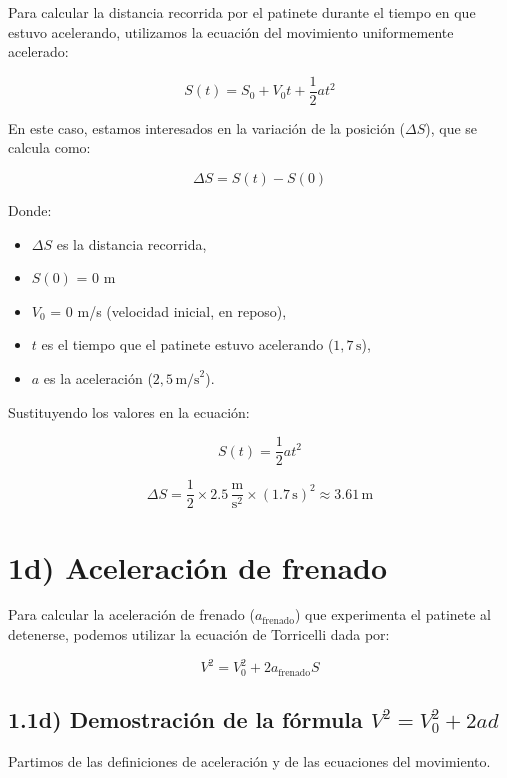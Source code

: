 \documentclass{article}
\begin{document}
Para calcular la distancia recorrida por el patinete durante el tiempo en que estuvo acelerando, utilizamos la ecuación del movimiento uniformemente acelerado:

\[
S(t) = S_0 + V_0 t + \frac{1}{2} a t^2
\]

En este caso, estamos interesados en la variación de la posición (\(\Delta S\)), que se calcula como:

\[
\Delta S = S(t) - S(0)
\]

Donde:
\begin{itemize}
    \item \(\Delta S\) es la distancia recorrida,
    \item \(S(0)\) = 0 m
    \item \(V_0\) = 0 m/s (velocidad inicial, en reposo),
    \item \(t\) es el tiempo que el patinete estuvo acelerando (\(1,7 \, \text{s}\)),
    \item \(a\) es la aceleración (\(2,5 \, \text{m/s}^2\)).
\end{itemize}

Sustituyendo los valores en la ecuación:

\[
    S(t) = \frac{1}{2} a t^2
\]

\[
    \Delta S = \frac{1}{2} \times 2.5 \, \frac{\text{m}}{\text{s}^2} \times (1.7 \, \text{s})^2 \approx \boxed{3.61 \, \text{m}}
\]


\section*{1d) Aceleración de frenado}

Para calcular la aceleración de frenado (\(a_{\text{frenado}}\)) que experimenta el patinete al detenerse, podemos utilizar la ecuación de Torricelli dada por:

\[
V^2 = V_0^2 + 2 a_{\text{frenado}} S
\]


\subsection*{1.1d) Demostración de la fórmula \( V^2 = V_0^2 + 2ad \)}
Partimos de las definiciones de aceleración y de las ecuaciones del movimiento.
\end{document}
